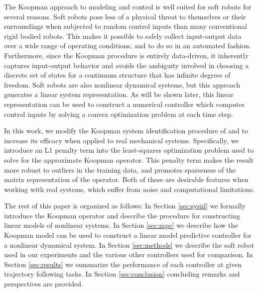 The Koopman approach to modeling and control is well suited for soft robots for several reasons.
Soft robots pose less of a physical threat to themselves or their surroundings when subjected to random control inputs than many conventional rigid bodied robots. 
This makes it possible to safely collect input-output data over a wide range of operating conditions, and to do so in an automated fashion. 
Furthermore, since the Koopman procedure is entirely data-driven, it inherently captures input-output behavior and avoids the ambiguity involved in choosing a discrete set of states for a continuum structure that has infinite degrees of freedom.
Soft robots are also nonlinear dynamical systems, but this approach generates a linear system representation.
As will be shown later, this linear representation can be used to construct a numerical controller which computes control inputs by solving a convex optimization problem at each time step.

In this work, we modify the Koopman system identification procedure of \citet{mauroy2016linear} and \citet{korda2018linear} to increase its efficacy when applied to real mechanical systems.
Specifically, we introduce an L1 penalty term into the least-squares optimization problem used to solve for the approximate Koopman operator.
This penalty term makes the result more robust to outliers in the training data, and promotes sparseness of the matrix representation of the operator.
Both of these are desirable features when working with real systems, which suffer from noise and computational limitations.




The rest of this paper is organized as follows:
In Section \ref{sec:sysid} we formally introduce the Koopman operator and describe the procedure for constructing linear models of nonlinear systems. 
In Section \ref{sec:mpc} we describe how the Koopman model can be used to construct a linear model predictive controller for a nonlinear dynamical system.
In Section \ref{sec:methods} we describe the soft robot used in our experiments and the various other controllers used for comparison.
In Section \ref{sec:results} we summarize the performance of each controller at given trajectory following tasks.
In Section \ref{sec:conclusion} concluding remarks and perspectives are provided.





